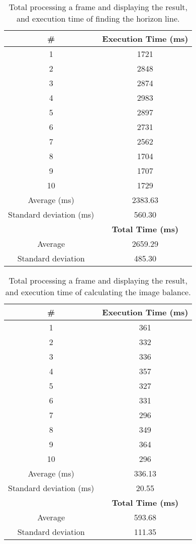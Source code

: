 \begin{table}[h]
	\footnotesize
    \begin{center}
    \begin{tabular}{c c}
    \hline 
    \textbf{\#} & \textbf{Execution Time (ms)}\\ \hline
1&	1721\\
2&	2848\\
3&	2874\\
4&	2983\\
5&	2897\\
6&	2731\\
7&	2562\\
8&	1704\\
9&	1707\\
10&	1729\\
	\hline
	Average (ms) &	2383.63 \\

	Standard deviation (ms) & 560.30\\
	\hline
	& \textbf{Total Time (ms)}\\
    \hline
    Average	& 2659.29\\
    Standard deviation & 485.30\\
    \hline
    \end{tabular}
	\end{center}
    \caption{Total processing a frame and displaying the result, and execution time of finding the horizon line.}
\end{table}

\begin{table}[h]
	\footnotesize
    \begin{center}
    \begin{tabular}{c c}
    \hline 
    \textbf{\#} & \textbf{Execution Time (ms)}\\ \hline
    1&	361\\
	2&	332\\
	3&	336\\
	4&	357\\
	5&	327\\
	6&	331\\
	7&	296\\
	8&	349\\
	9&	364\\
	10&	296\\
	\hline
	Average (ms) &	336.13\\
	Standard deviation (ms) & 20.55\\
	\hline
	&\textbf{Total Time (ms)}\\
    \hline
    Average	& 593.68\\
    Standard deviation & 111.35\\
    \hline
    \end{tabular}
	\end{center}
    \caption{Total processing a frame and displaying the result, and execution time of calculating the image balance.}
\end{table}
